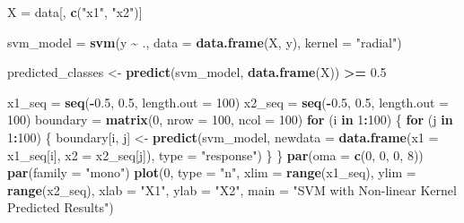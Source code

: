 \documentclass[
]{article}
\newenvironment{Shaded}{\begin{snugshade}}{\end{snugshade}}
\newcommand{\AttributeTok}[1]{\textcolor[rgb]{0.13,0.29,0.53}{#1}}
\newcommand{\ControlFlowTok}[1]{\textcolor[rgb]{0.13,0.29,0.53}{\textbf{#1}}}
\newcommand{\DecValTok}[1]{\textcolor[rgb]{0.00,0.00,0.81}{#1}}
\newcommand{\FloatTok}[1]{\textcolor[rgb]{0.00,0.00,0.81}{#1}}
\newcommand{\FunctionTok}[1]{\textcolor[rgb]{0.13,0.29,0.53}{\textbf{#1}}}
\newcommand{\NormalTok}[1]{#1}
\newcommand{\OtherTok}[1]{\textcolor[rgb]{0.56,0.35,0.01}{#1}}
\newcommand{\SpecialCharTok}[1]{\textcolor[rgb]{0.81,0.36,0.00}{\textbf{#1}}}
\newcommand{\StringTok}[1]{\textcolor[rgb]{0.31,0.60,0.02}{#1}}
\begin{document}
\begin{Shaded}
\begin{Highlighting}[]
\NormalTok{X }\OtherTok{=}\NormalTok{ data[, }\FunctionTok{c}\NormalTok{(}\StringTok{"x1"}\NormalTok{, }\StringTok{"x2"}\NormalTok{)]}

\NormalTok{svm\_model }\OtherTok{=} \FunctionTok{svm}\NormalTok{(y }\SpecialCharTok{\textasciitilde{}}\NormalTok{ ., }\AttributeTok{data =} \FunctionTok{data.frame}\NormalTok{(X, y), }\AttributeTok{kernel =} \StringTok{"radial"}\NormalTok{)}

\NormalTok{predicted\_classes }\OtherTok{\textless{}{-}} \FunctionTok{predict}\NormalTok{(svm\_model, }\FunctionTok{data.frame}\NormalTok{(X)) }\SpecialCharTok{\textgreater{}=} \FloatTok{0.5}

\NormalTok{x1\_seq }\OtherTok{=} \FunctionTok{seq}\NormalTok{(}\SpecialCharTok{{-}}\FloatTok{0.5}\NormalTok{, }\FloatTok{0.5}\NormalTok{, }\AttributeTok{length.out =} \DecValTok{100}\NormalTok{)}
\NormalTok{x2\_seq }\OtherTok{=} \FunctionTok{seq}\NormalTok{(}\SpecialCharTok{{-}}\FloatTok{0.5}\NormalTok{, }\FloatTok{0.5}\NormalTok{, }\AttributeTok{length.out =} \DecValTok{100}\NormalTok{)}
\NormalTok{boundary }\OtherTok{=} \FunctionTok{matrix}\NormalTok{(}\DecValTok{0}\NormalTok{, }\AttributeTok{nrow =} \DecValTok{100}\NormalTok{, }\AttributeTok{ncol =} \DecValTok{100}\NormalTok{)}
\ControlFlowTok{for}\NormalTok{ (i }\ControlFlowTok{in} \DecValTok{1}\SpecialCharTok{:}\DecValTok{100}\NormalTok{) \{}
  \ControlFlowTok{for}\NormalTok{ (j }\ControlFlowTok{in} \DecValTok{1}\SpecialCharTok{:}\DecValTok{100}\NormalTok{) \{}
\NormalTok{    boundary[i, j] }\OtherTok{\textless{}{-}} \FunctionTok{predict}\NormalTok{(svm\_model, }\AttributeTok{newdata =} \FunctionTok{data.frame}\NormalTok{(}\AttributeTok{x1 =}\NormalTok{ x1\_seq[i], }\AttributeTok{x2 =}\NormalTok{ x2\_seq[j]), }\AttributeTok{type =} \StringTok{"response"}\NormalTok{)}
\NormalTok{  \}}
\NormalTok{\}}
\FunctionTok{par}\NormalTok{(}\AttributeTok{oma =} \FunctionTok{c}\NormalTok{(}\DecValTok{0}\NormalTok{, }\DecValTok{0}\NormalTok{, }\DecValTok{0}\NormalTok{, }\DecValTok{8}\NormalTok{)) }
\FunctionTok{par}\NormalTok{(}\AttributeTok{family =} \StringTok{"mono"}\NormalTok{)}
\FunctionTok{plot}\NormalTok{(}\DecValTok{0}\NormalTok{, }\AttributeTok{type =} \StringTok{"n"}\NormalTok{, }\AttributeTok{xlim =} \FunctionTok{range}\NormalTok{(x1\_seq), }\AttributeTok{ylim =} \FunctionTok{range}\NormalTok{(x2\_seq), }\AttributeTok{xlab =} \StringTok{"X1"}\NormalTok{, }\AttributeTok{ylab =} \StringTok{"X2"}\NormalTok{, }\AttributeTok{main =} \StringTok{"SVM with Non{-}linear Kernel Predicted Results"}\NormalTok{)}


\end{Highlighting}
\end{Shaded}
\end{document}

